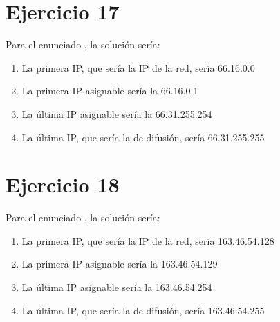 \documentclass[letterpaper,10pt,spanish]{sphinxmanual}
\begin{document}
\section{Ejercicio 17}
\label{\detokenize{t2_integracion_elementos/ejercicios_subredes_ipv4/rangos_direcciones:id17}}
\sphinxAtStartPar
Para el enunciado , la solución sería:
\begin{enumerate}
%
\item {} 
\sphinxAtStartPar
La primera IP, que sería la IP de la red, sería 66.16.0.0

\item {} 
\sphinxAtStartPar
La primera IP asignable sería la 66.16.0.1

\item {} 
\sphinxAtStartPar
La última IP asignable sería la 66.31.255.254

\item {} 
\sphinxAtStartPar
La última IP, que sería la de difusión, sería 66.31.255.255

\end{enumerate}


\section{Ejercicio 18}
\label{\detokenize{t2_integracion_elementos/ejercicios_subredes_ipv4/rangos_direcciones:id18}}
\sphinxAtStartPar
Para el enunciado , la solución sería:
\begin{enumerate}
%
\item {} 
\sphinxAtStartPar
La primera IP, que sería la IP de la red, sería 163.46.54.128

\item {} 
\sphinxAtStartPar
La primera IP asignable sería la 163.46.54.129

\item {} 
\sphinxAtStartPar
La última IP asignable sería la 163.46.54.254

\item {} 
\sphinxAtStartPar
La última IP, que sería la de difusión, sería 163.46.54.255

\end{enumerate}
\end{document}
